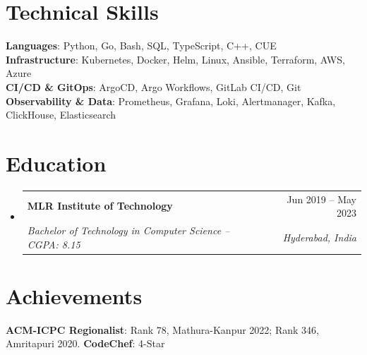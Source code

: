 \documentclass[letterpaper,11pt]{article}
\makeatletter
\newcommand{\resumeSubheading}[4]{
  \vspace{-2pt}\item
    \begin{tabular*}{0.97\textwidth}[t]{l@{\extracolsep{\fill}}r}
      \textbf{#1} & #2 \\
      \textit{\small#3} & \textit{\small #4} \\
    \end{tabular*}\vspace{-7pt}
}
\newcommand{\resumeSubHeadingListStart}{\begin{itemize}[leftmargin=0.15in, label={}]}
\newcommand{\resumeSubHeadingListEnd}{\end{itemize}}
\makeatother
\begin{document}
\section{Technical Skills}
 \begin{itemize}[leftmargin=0.15in, label={}]
    \small{\item{
     \textbf{Languages}{: Python, Go, Bash, SQL, TypeScript, C++, CUE} \\
     \textbf{Infrastructure}{: Kubernetes, Docker, Helm, Linux, Ansible, Terraform, AWS, Azure} \\
     \textbf{CI/CD \& GitOps}{: ArgoCD, Argo Workflows, GitLab CI/CD, Git} \\
     \textbf{Observability \& Data}{: Prometheus, Grafana, Loki, Alertmanager, Kafka, ClickHouse, Elasticsearch}
    }}
 \end{itemize}


\section{Education}
  \resumeSubHeadingListStart
    \resumeSubheading
      {MLR Institute of Technology}{Jun 2019 -- May 2023}
      {Bachelor of Technology in Computer Science -- CGPA: 8.15}{Hyderabad, India}
  \resumeSubHeadingListEnd


\section{Achievements}
 \begin{itemize}[leftmargin=0.15in, label={}]
    \small{\item{
     \textbf{ACM-ICPC Regionalist}: Rank 78, Mathura-Kanpur 2022; Rank 346, Amritapuri 2020. \textbf{CodeChef}: 4-Star
    }}
 \end{itemize}

\end{document}

